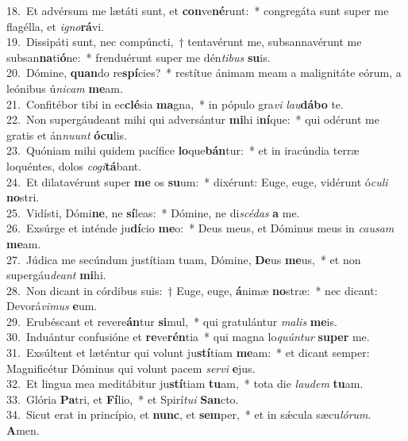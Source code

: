 {18.~}Et advérsum me lætáti sunt, et \textbf{con}ve\textbf{né}runt:~* congregáta sunt super me flagélla, et \textit{i}\textit{gno}\textbf{rá}vi.\\
{19.~}Dissipáti sunt, nec compúncti,~† tentavérunt me, subsannavérunt me subsan\textbf{na}ti\textbf{ó}ne:~* frenduérunt super me dén\textit{ti}\textit{bus} \textbf{su}is.\\
{20.~}Dómine, \textbf{quan}do re\textbf{spí}cies?~* restítue ánimam meam a malignitáte eórum, a leónibus ú\textit{ni}\textit{cam} \textbf{me}am.\\
{21.~}Confitébor tibi in ec\textbf{clé}sia \textbf{ma}gna,~* in pópulo gra\textit{vi} \textit{lau}\textbf{dá}\textbf{bo} te.\\
{22.~}Non supergáudeant mihi qui adversántur \textbf{mi}hi i\textbf{ní}que:~* qui odérunt me gratis et án\textit{nu}\textit{unt} \textbf{ó}\textbf{cu}lis.\\
{23.~}Quóniam mihi quidem pacífice \textbf{lo}que\textbf{bán}tur:~* et in iracúndia terræ loquéntes, dolos \textit{co}\textit{gi}\textbf{tá}bant.\\
{24.~}Et dilatavérunt super \textbf{me} os \textbf{su}um:~* dixérunt: Euge, euge, vidérunt ó\textit{cu}\textit{li} \textbf{no}stri.\\
{25.~}Vidísti, Dómi\textbf{ne}, ne \textbf{sí}leas:~* Dómine, ne di\textit{scé}\textit{das} \textbf{a} me.\\
{26.~}Exsúrge et inténde ju\textbf{dí}cio \textbf{me}o:~* Deus meus, et Dóminus meus in \textit{cau}\textit{sam} \textbf{me}am.\\
{27.~}Júdica me secúndum justítiam tuam, Dómine, \textbf{De}us \textbf{me}us,~* et non supergáu\textit{de}\textit{ant} \textbf{mi}hi.\\
{28.~}Non dicant in córdibus suis:~† Euge, euge, \textbf{á}nimæ \textbf{no}stræ:~* nec dicant: Devorá\textit{vi}\textit{mus} \textbf{e}um.\\
{29.~}Erubéscant et revere\textbf{án}tur \textbf{si}mul,~* qui gratulántur \textit{ma}\textit{lis} \textbf{me}is.\\
{30.~}Induántur confusióne et \textbf{re}ve\textbf{rén}tia~* qui magna lo\textit{quún}\textit{tur} \textbf{su}\textbf{per} me.\\
{31.~}Exsúltent et læténtur qui volunt ju\textbf{stí}tiam \textbf{me}am:~* et dicant semper: Magnificétur Dóminus qui volunt pacem \textit{ser}\textit{vi} \textbf{e}jus.\\
{32.~}Et lingua mea meditábitur ju\textbf{stí}tiam \textbf{tu}am,~* tota die \textit{lau}\textit{dem} \textbf{tu}am.\\
{33.~}Glória \textbf{Pa}tri, et \textbf{Fí}lio,~* et Spirí\textit{tu}\textit{i} \textbf{San}cto.\\
{34.~}Sicut erat in princípio, et \textbf{nunc}, et \textbf{sem}per,~* et in sǽcula sæcu\textit{ló}\textit{rum}. \textbf{A}men.\\
